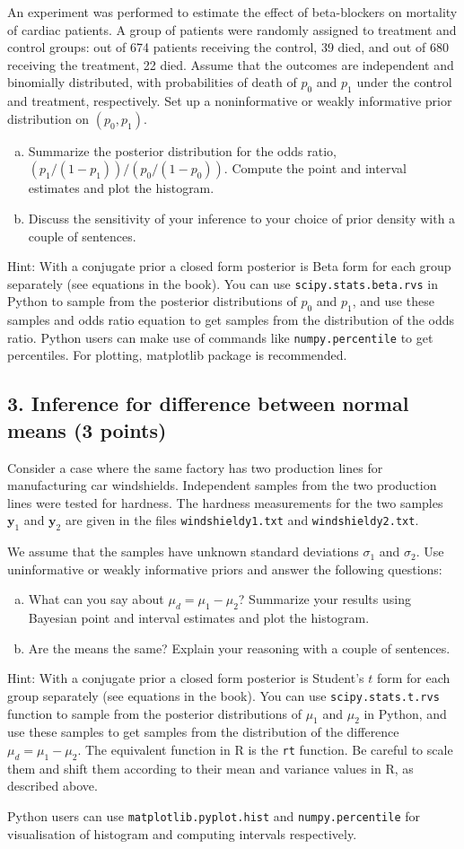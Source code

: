 \documentclass[a4paper,11pt]{article}
\begin{document}
An experiment was performed to estimate the effect of beta-blockers
on mortality of cardiac patients. A group of patients were randomly
assigned to treatment and control groups: out of 674 patients
receiving the control, 39 died, and out of 680 receiving the
treatment, 22 died. Assume that the outcomes are independent and
binomially distributed, with probabilities of death of $p_0$ and $p_1$
under the control and treatment, respectively. Set up a noninformative
or weakly informative prior distribution on $(p_0,p_1)$. 
\begin{enumerate}[a)]
\item Summarize the posterior distribution for the odds ratio, $(p_1/(1-p_1))/(p_0/(1-p_0))$. Compute the point and interval estimates and plot the histogram. 
\item Discuss the sensitivity of your inference
to your choice of prior density with a couple of sentences.
\end{enumerate}
Hint: With a conjugate prior a closed form posterior is Beta form for
each group separately (see equations in the book). You can use {\tt scipy.stats.beta.rvs} in Python
to sample from the posterior distributions of $p_0$ and $p_1$, and use
these samples and odds ratio equation to get samples from the
distribution of the odds ratio.
Python users can make use of commands like {\tt numpy.percentile} to get percentiles. For plotting, matplotlib package is recommended.

\subsection*{3. Inference for difference between normal means (3 points)}

Consider a case where the same factory has two production lines for
manufacturing car windshields. Independent samples from the two
production lines were tested for hardness. The hardness measurements
for the two samples $\mathbf{y}_1$ and $\mathbf{y}_2$ are given in the
files {\tt windshieldy1.txt} and {\tt windshieldy2.txt}.

We assume that the samples have unknown standard deviations $\sigma_1$
and $\sigma_2$. Use uninformative or weakly informative priors and
answer the following questions:
\begin{enumerate}[a)]
\item What can you say about $\mu_d = \mu_1 - \mu_2$? Summarize
  your results using Bayesian point and interval estimates and plot the histogram.     
\item Are the means the same? Explain your reasoning with a couple of sentences.
\end{enumerate}
Hint: With a conjugate prior a closed form posterior is Student's $t$
form for each group separately (see equations in the book). You can
use {\tt scipy.stats.t.rvs} function to sample from the posterior distributions of $\mu_1$ and
$\mu_2$ in Python, and use these samples to get samples from the distribution of
the difference $\mu_d = \mu_1 - \mu_2$. The equivalent function in R is the {\tt rt} function. Be careful to scale them and shift them according to their mean and variance values in R, as described above.

Python users can use {\tt matplotlib.pyplot.hist} and {\tt numpy.percentile} for visualisation of histogram and computing intervals respectively.
\end{document}
